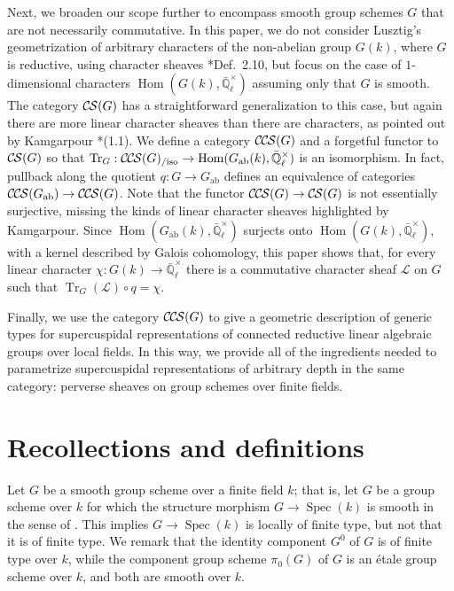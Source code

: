 \documentclass[10pt]{amsart}
\theoremstyle{plain}
\theoremstyle{definition}
\newcommand{\EE}{\mathbb{\bar Q}_\ell}
\newcommand{\Fq}{k}
\newcommand{\EEx}{\EE^\times}
\DeclareMathOperator{\Hom}{Hom}
\newcommand{\Spec}[1]{{\operatorname{Spec}(#1)}}
\newcommand{\ab}{_{\operatorname{ab}}}
\newcommand{\TrFrob}[1]{\operatorname{Tr}_{#1}}
\newcommand{\cs}[1]{{\mathcal{#1}}}
\newcommand{\CS}{{\mathcal{C\hskip-0.8pt S}}}
\newcommand{\CCS}{{\mathcal{C\hskip-.8pt C\hskip-0.8pt S}}}
\newcommand{\CCSiso}[1]{\CCS(#1)_{/\text{iso}}}
\begin{document}
Next, we broaden our scope further to encompass smooth group schemes $G$ that are not necessarily commutative.
In this paper, we do not consider Lusztig's geometrization of arbitrary characters of the non-abelian group $G(k)$, where $G$ is reductive,
using character sheaves \cite{lusztig:85a}*{Def.~2.10}, but focus on the case of $1$-dimensional characters
$\Hom(G(k), \EEx)$ assuming only that $G$ is smooth. The category $\CS(G)$ has a straightforward generalization to this case, but again
there are more linear character sheaves than there are characters, as pointed out by Kamgarpour \cite{kamgarpour:09a}*{(1.1)}.
We define a category $\CCS(G)$ and a forgetful functor to $\CS(G)$ so that $\TrFrob{G} : \CCSiso{G} \to \Hom(G\ab(k), \EEx)$
is an isomorphism.  In fact, pullback along the quotient $q : G \to G\ab$ defines an equivalence of categories
$\CCS(G\ab) \to \CCS(G)$.  Note that the functor $\CCS(G) \to \CS(G)$ is not essentially surjective, missing
the kinds of linear character sheaves highlighted by Kamgarpour.  
Since $\Hom(G\ab(k), \EEx)$ surjects
onto $\Hom(G(k), \EEx)$, with a kernel described by Galois cohomology, this paper shows that, for every linear character $\chi : G(k) \to \EEx$ there is a commutative character sheaf $\cs{L}$ on $G$ such that $\TrFrob{G}(\cs{L})\circ q = \chi$.

Finally, we use the category $\CCS(G)$ to give a geometric description of generic types for supercuspidal representations
of connected reductive linear algebraic groups over local fields.  In this way, we provide all of the ingredients
needed to parametrize supercuspidal representations of arbitrary depth in the same category:
perverse sheaves on group schemes over finite fields.


\section{Recollections and definitions} \label{sec:defs}

Let $G$ be a smooth group scheme over a finite field $\Fq$; that is, let $G$ be a group scheme over $\Fq$
for which the structure morphism $G \to \Spec{\Fq}$ is smooth in the sense of .
This implies $G \to \Spec{\Fq}$ is locally of finite type, but not that it is of finite type.
We remark that the identity component $G^0$ of $G$ is of finite type over $\Fq$, while the component group scheme
$\pi_0(G)$ of $G$ is an \'etale group scheme over $\Fq$, and both are smooth over $\Fq$.
\end{document}
